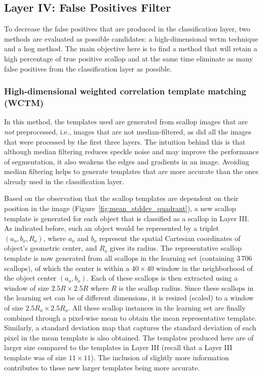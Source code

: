 \documentclass {udthesis}
\begin{document}
\subsection{Layer IV: False Positives Filter}

To decrease the false positives that are produced in the classification layer, two methods are evaluated as possible candidates: a high-dimensional \gls{wctm} technique and a \gls{hog} method. 
The main objective here is to find a method that will retain a high percentage of true positive scallop and at the same time eliminate as many false positives from the classification layer as possible.

\subsubsection{High-dimensional weighted correlation template matching (WCTM)}
In this method, the templates used are generated from scallop images that are \emph{not} preprocessed, i.e., images that are not median-filtered, as did all the images that were processed by the first three layers. 
The intuition behind this is that although median filtering reduces speckle noise and may improve the performance of segmentation, it also weakens the edges and gradients in an image. 
Avoiding median filtering helps to generate templates that are more accurate than the ones already used in the classification layer.

Based on the observation that the scallop templates are dependent on their position in the image (Figure~\ref{fig:mean_stddev_quadrant}), a new scallop template is generated for each object that is classified as a scallop in Layer III. 
As indicated before, such an object would be represented by a triplet $(a_o,b_o,R_o)$, where $a_o$ and $b_o$ represent the spatial Cartesian coordinates of object's geometric center, and $R_o$ gives its radius. 
The representative scallop template is now generated from all scallops in the learning set (containing 3\,706 scallops), of which the center is within a $40\times40$ window in the neighborhood of the object center $(a_o,b_o)$. 
Each of these scallops is then extracted using a window of size $2.5R\times2.5R$ where $R$ is the scallop radius. 
Since these scallops in the learning set can be of different dimensions, it is resized (scaled) to a window of size $2.5R_o\times2.5R_o$. 
All these scallop instances in the learning set are finally combined through a pixel-wise mean to obtain the mean representative template. 
Similarly, a standard deviation map that captures the standard deviation of each pixel in the mean template is also obtained.  
The templates produced here are of larger size compared to the templates in Layer III (recall that a Layer III template was of size $11\times11$).
The inclusion of slightly more information contributes to these new larger templates being more accurate.
\end{document}
